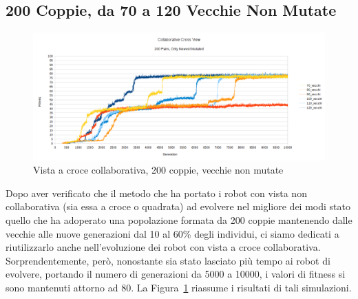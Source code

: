 \subsection{200 Coppie, da 70 a 120 Vecchie Non Mutate}
\begin{figure}[ht]
	\centering
	\includegraphics[scale=0.7,angle=90]{imgs/cross_c_200_pairs_70_120_old_not_mutated.png}
	\caption{Vista a croce collaborativa, 200 coppie, vecchie non mutate}
	\label{figure:cross_c_200_70_120_non}
\end{figure}
Dopo aver verificato che il metodo che ha portato i robot con vista non
collaborativa (sia essa a croce o quadrata) ad evolvere nel migliore dei modi 
stato quello che ha adoperato una popolazione formata da 200 coppie mantenendo
dalle vecchie alle nuove generazioni dal 10 al 60\% degli individui, ci siamo
dedicati a riutilizzarlo anche nell'evoluzione dei robot con vista a croce
collaborativa.\newline
Sorprendentemente, però, nonostante sia stato lasciato più tempo ai robot di
evolvere, portando il numero di generazioni da 5000 a 10000, i valori di fitness
si sono mantenuti attorno ad 80. La Figura~\ref{figure:cross_c_200_70_120_non}
riassume i risultati di tali simulazioni.

